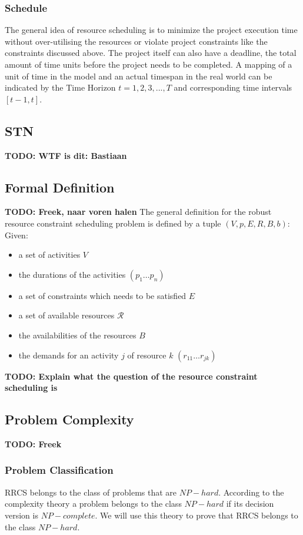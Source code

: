 \documentclass{article}
\newcommand{\TODO}[1]{{\color{red}\textbf{TODO: #1}}}
\begin{document}
\subsubsection{Schedule}
The general idea of resource scheduling is to minimize the project execution time without over-utilising the resources or violate project constraints like the constraints discussed above. The project itself can also have a deadline, the total amount of time units before the project needs to be completed. A mapping of a unit of time in the model and an actual timespan in the real world can be indicated by the Time Horizon $t=1,2,3,. . .,T$ and corresponding time intervals $[t-1,t]$. 

\subsection{STN}
\TODO{WTF is dit: Bastiaan}

\subsection{Formal Definition}
\TODO{Freek, naar voren halen}
The general definition for the robust resource constraint scheduling problem is defined by a tuple $(V, p, E,R,B, b)$:\\

Given:
\begin{itemize}
\item a set of activities $V$
\item the durations of the activities $(p_1\ldots p_n)$
\item a set of constraints which needs to be satisfied $E$
\item a set of available resources $\mathcal{R}$
\item the availabilities of the resources $B$
\item the demands for an activity $j$ of resource $k$ $(r_{11}\ldots r_{jk})$
\end{itemize}

\TODO{Explain what the question of the resource constraint scheduling is}

\subsection{Problem Complexity}
\TODO{Freek}
\subsubsection{Problem Classification}
RRCS belongs to the class of problems that are $NP-hard$. According to the complexity theory a problem belongs to the class $NP-hard$ if its decision version is $NP-complete$. We will use this theory to prove that RRCS belongs to the class $NP-hard$.
\end{document}
